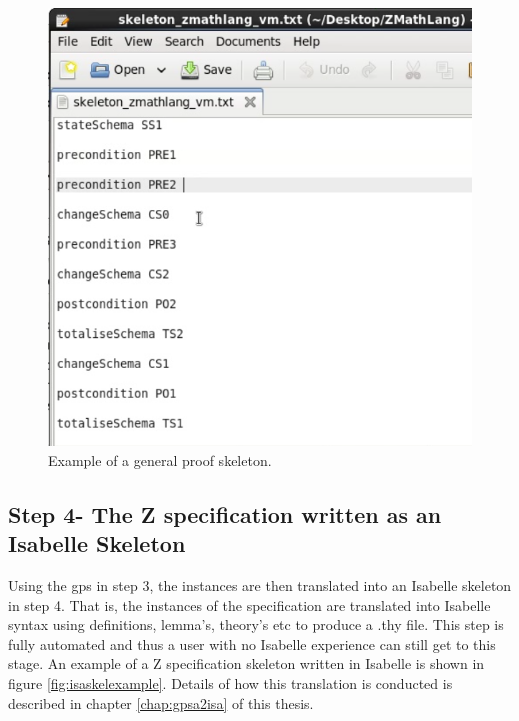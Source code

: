 \begin{figure}[H]
 \begin{center}
 \includegraphics [scale=0.2]{Figures/Design/proofskel.png}
 \caption{Example of a general proof skeleton.}
 \label{fig:proofskelexample}
\end{center}
\end{figure} 

\subsection{Step 4- The Z specification written as an Isabelle Skeleton}

Using the \gls{gps} in step 3, the instances are then translated into an
Isabelle skeleton in step 4. That is, the instances of the specification are
translated into Isabelle syntax using definitions, lemma's, theory's etc to
produce a .thy file. This step is fully automated and thus a user with no
Isabelle experience can still get to this stage. An example of a Z specification
skeleton written in Isabelle is shown in figure \ref{fig:isaskelexample}.
Details of how this translation is conducted is described in chapter
\ref{chap:gpsa2isa} of this thesis.

